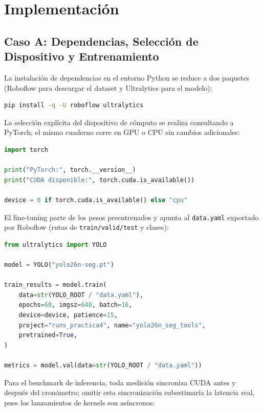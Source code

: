 \section{Implementación}

\subsection{Caso A: Dependencias, Selección de Dispositivo y Entrenamiento}

La instalación de dependencias en el entorno Python se reduce a dos paquetes
(Roboflow para descargar el dataset y Ultralytics para el modelo):

\begin{lstlisting}[style=code, language=bash]
pip install -q -U roboflow ultralytics
\end{lstlisting}

La selección explícita del dispositivo de cómputo se realiza consultando a
PyTorch; el mismo cuaderno corre en GPU o CPU sin cambios adicionales:

\begin{lstlisting}[style=code, language=Python]
import torch

print("PyTorch:", torch.__version__)
print("CUDA disponible:", torch.cuda.is_available())

device = 0 if torch.cuda.is_available() else "cpu"
\end{lstlisting}

El fine-tuning parte de los pesos preentrenados y apunta al \texttt{data.yaml}
exportado por Roboflow (rutas de \texttt{train/valid/test} y clases):

\begin{lstlisting}[style=code, language=Python]
from ultralytics import YOLO

model = YOLO("yolo26n-seg.pt")

train_results = model.train(
    data=str(YOLO_ROOT / "data.yaml"),
    epochs=60, imgsz=640, batch=16,
    device=device, patience=15,
    project="runs_practica4", name="yolo26n_seg_tools",
    pretrained=True,
)

metrics = model.val(data=str(YOLO_ROOT / "data.yaml"))
\end{lstlisting}

Para el benchmark de inferencia, toda medición sincroniza CUDA antes y después
del cronómetro; omitir esta sincronización subestimaría la latencia real, pues
los lanzamientos de kernels son asíncronos:


